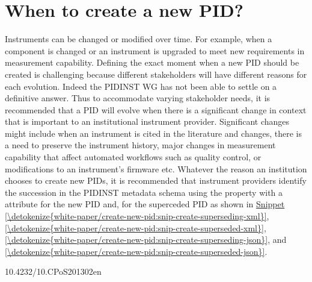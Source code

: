 \documentclass[a4paper,10pt,english]{sphinxmanual}
\begin{document}
\section{When to create a new PID?}
\label{\detokenize{white-paper/create-new-pid:when-to-create-a-new-pid}}\label{\detokenize{white-paper/create-new-pid::doc}}
Instruments can be changed or modified over time. For example, when a
component is changed or an instrument is upgraded to meet new
requirements in measurement capability. Defining the exact moment when a
new PID should be created is challenging because different stakeholders
will have different reasons for each evolution. Indeed the PIDINST WG
has not been able to settle on a definitive answer. Thus to accommodate
varying stakeholder needs, it is recommended that a PID will evolve when
there is a significant change in context that is important to an
institutional instrument provider. Significant changes might include
when an instrument is cited in the literature and changes, there is a
need to preserve the instrument history, major changes in measurement
capability that affect automated workflows such as quality control, or
modifications to an instrument’s firmware etc. Whatever the reason an
institution chooses to create new PIDs, it is recommended that
instrument providers identify the succession in the PIDINST metadata
schema using the  property with a 
attribute  for the new PID and, 
for the superceded PID as shown in
\hyperref[\detokenize{white-paper/create-new-pid:snip-create-superseding-xml}]{Snippet \ref{\detokenize{white-paper/create-new-pid:snip-create-superseding-xml}}},
\hyperref[\detokenize{white-paper/create-new-pid:snip-create-superseded-xml}]{\ref{\detokenize{white-paper/create-new-pid:snip-create-superseded-xml}}},
\hyperref[\detokenize{white-paper/create-new-pid:snip-create-superseding-json}]{\ref{\detokenize{white-paper/create-new-pid:snip-create-superseding-json}}}, and
\hyperref[\detokenize{white-paper/create-new-pid:snip-create-superseded-json}]{\ref{\detokenize{white-paper/create-new-pid:snip-create-superseded-json}}}.
\def\sphinxLiteralBlockLabel{\label{\detokenize{white-paper/create-new-pid:id1}}\label{\detokenize{white-paper/create-new-pid:snip-create-superseding-xml}}}
\begin{sphinxVerbatim}[commandchars=\\\{\}]
       10.4232/10.CPoS\PYGZhy{}2013\PYGZhy{}02en
\end{sphinxVerbatim}
\end{document}
